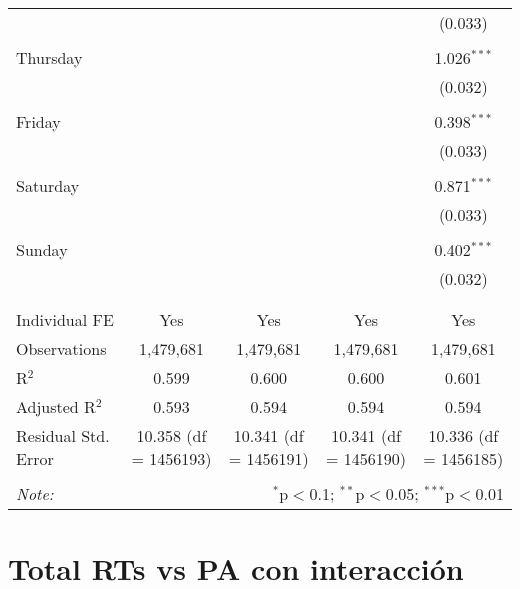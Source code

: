 \documentclass[
]{article}
\begin{document}
\begin{table}[!htbp]
{\begin{tabular}{@{\extracolsep{5pt}}lcccc}
  &  &  &  & (0.033) \\ 
  & & & & \\ 
 Thursday &  &  &  & 1.026$^{***}$ \\ 
  &  &  &  & (0.032) \\ 
  & & & & \\ 
 Friday &  &  &  & 0.398$^{***}$ \\ 
  &  &  &  & (0.033) \\ 
  & & & & \\ 
 Saturday &  &  &  & 0.871$^{***}$ \\ 
  &  &  &  & (0.033) \\ 
  & & & & \\ 
 Sunday &  &  &  & 0.402$^{***}$ \\ 
  &  &  &  & (0.032) \\ 
  & & & & \\ 
\hline \\[-1.8ex] 
Individual FE & Yes & Yes & Yes & Yes \\ 
Observations & 1,479,681 & 1,479,681 & 1,479,681 & 1,479,681 \\ 
R$^{2}$ & 0.599 & 0.600 & 0.600 & 0.601 \\ 
Adjusted R$^{2}$ & 0.593 & 0.594 & 0.594 & 0.594 \\ 
Residual Std. Error & 10.358 (df = 1456193) & 10.341 (df = 1456191) & 10.341 (df = 1456190) & 10.336 (df = 1456185) \\ 
\hline 
\hline \\[-1.8ex] 
\textit{Note:}  & \multicolumn{4}{r}{$^{*}$p$<$0.1; $^{**}$p$<$0.05; $^{***}$p$<$0.01} \\ 
\end{tabular}
} 
\end{table} 
\newpage
\section{Total RTs vs PA con interacción}
\end{document}
